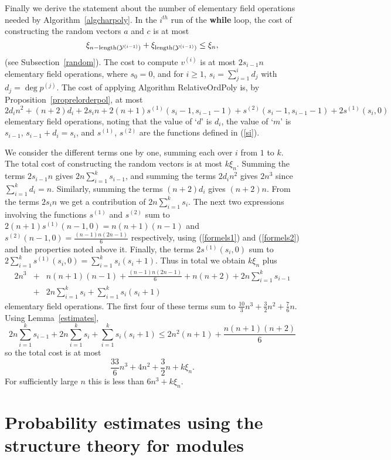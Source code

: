 Finally we derive the statement about the number of elementary field operations
needed by Algorithm~\ref{algcharpoly}.
In the $i^{th}$ run of the {\bf while} loop, the cost of constructing the
random vectors $a$ and $c$ is at most 
\[ \xi_{n-\mathrm{length}(\mathcal{Y}^{(i-1)})}+\xi_{\mathrm{length}(\mathcal{Y}^{(i-1)})}
\leq \xi_{n}, 
\]
(see Subsection~\ref{random}). The cost to compute $v^{(i)}$ is 
at most $2s_{i-1}n$ elementary field operations,
where $s_0=0$, and for $i\geq1$, $s_{i}=\sum_{j=1}^{i}d_j$ with 
$d_j=\deg p^{(j)}$. The cost 
of applying Algorithm {\sc RelativeOrdPoly}
is, by Proposition~\ref{proprelorderpol}, at most
\[ 
2d_in^2 + (n+2)d_i +2s_{i}n + 2(n+1)s^{(1)}(s_i-1,s_{i-1}-1) 
+ s^{(2)}(s_i-1,s_{i-1}-1) + 2s^{(1)}(s_i,0) 
\]
elementary field operations, noting that the value 
of `$d$' is $d_i$, the value of `$m$' is $s_{i-1}$, $s_{i-1}+d_i=s_i$,
and $s^{(1)}$, $s^{(2)}$ are the functions defined in (\ref{si}).

We consider the different terms
one by one, summing each over $i$ from $1$ to $k$. 
The total cost of constructing the random vectors is at most $k\xi_{n}$.
Summing the terms $2 s_{i-1} n$ gives $2n\sum_{i=1}^{k} s_{i-1}$, and
summing the terms $2d_in^2$ gives $2n^3$ since $\sum_{i=1}^k d_i=n$. 
Similarly, summing the terms
$(n+2)d_i$ gives $(n+2)n$. From the terms $2s_in$ we
get a contribution of 
$2n \sum_{i=1}^{k} s_i$.
The next two expressions involving the functions $s^{(1)}$ and $s^{(2)}$
sum to $2(n+1)s^{(1)}(n-1,0) = n(n+1)(n-1)$ and $s^{(2)}(n-1,0) = 
\frac{(n-1)n(2n-1)}{6}$ respectively, using (\ref{formels1}) and
(\ref{formels2}) and the properties noted
above it. 
Finally, the terms $2s^{(1)}(s_i,0)$ sum to 
$2\sum_{i=1}^k s^{(1)}(s_i,0) 
= \sum_{i=1}^k s_i(s_i+1)$.
Thus in total we obtain $k\xi_n$ plus
\begin{eqnarray*}
 2n^3
   &+&n(n+1)(n-1)
   +\frac{(n-1)n(2n-1)}{6}
   +n(n+2)
   +2n\sum_{i=1}^k s_{i-1} \\
   &+&2n\sum_{i=1}^k s_i
   +\sum_{i=1}^k s_i(s_i+1) 
\end{eqnarray*}
elementary field operations. The first four of these terms sum to $\frac{10}{3}n^3
   +\frac{3}{2}n^2
   +\frac{7}{6}n$. 
Using Lemma~\ref{estimates},
\[ 
   2n\sum_{i=1}^k s_{i-1}
   +2n\sum_{i=1}^k s_i
   +\sum_{i=1}^k s_i(s_i+1)\leq 2n^2(n+1)+\frac{n(n+1)(n+2)}{6} \]
so the total cost is at most 
\[
\frac{33}{6}n^3+4n^2+\frac{3}{2}n +k\xi_n.
\]
For sufficiently large $n$ this is less than $6n^3+k\xi_n$.
\proofend


\section{Probability estimates using the structure theory for modules}
\label{probest}

